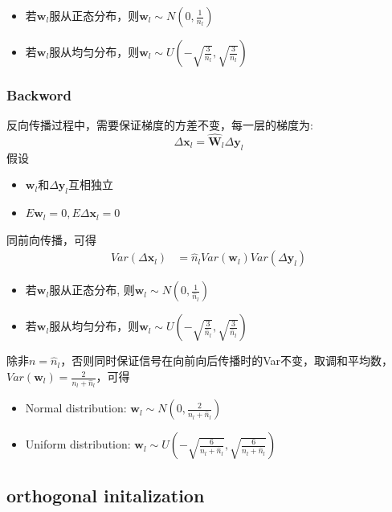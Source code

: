 \begin{itemize}
    \item 若$\mathbf{w}_l$服从正态分布，则$\mathbf{w}_l \sim N(0, \frac{1}{n_l})$
    \item 若$\mathbf{w}_l$服从均匀分布，则$\mathbf{w}_l \sim U(-\sqrt{\frac{3}{n_l}}, \sqrt{\frac{3}{n_l}})$
\end{itemize}

\subsubsection{Backword}
反向传播过程中，需要保证梯度的方差不变，每一层的梯度为:
\begin{equation}
    \Delta \mathbf{x}_l = \hat{\mathbf{W}}_l \Delta \mathbf{y}_l
\end{equation}
假设
\begin{itemize}
    \item $\mathbf{w}_l$和$\Delta{\mathbf{y}}_l$互相独立
    \item $E\mathbf{w}_l = 0, E\Delta{\mathbf{x}}_l = 0$
\end{itemize}
同前向传播，可得
\begin{equation}
    \begin{split}
        Var(\Delta{\mathbf{x}_l}) &= \hat n_l Var(\mathbf{w}_l)Var(\Delta{\mathbf{y}}_l)
    \end{split}
\end{equation}
\begin{itemize}
    \item 若$\mathbf{w}_l$服从正态分布, 则$\mathbf{w}_l \sim N(0, \frac{1}{\hat n_l})$
    \item 若$\mathbf{w}_l$服从均匀分布，则$\mathbf{w}_l \sim U(-\sqrt{\frac{3}{\hat n_l}}, \sqrt{\frac{3}{\hat n_l}})$
\end{itemize}

除非$n = \hat n_l$，否则同时保证信号在向前向后传播时的Var不变，取调和平均数，$Var(\mathbf{w}_l) = \frac{2}{n_l + \hat n_l}$，可得
\begin{itemize}
    \item Normal distribution: $\mathbf{w}_l \sim N(0, \frac{2}{n_l + \hat n_l})$
    \item Uniform distribution: $\mathbf{w}_l \sim U(-\sqrt{\frac{6}{n_l+\hat n_l}}, \sqrt{\frac{6}{n_l+\hat n_l}})$
\end{itemize}


\subsection{orthogonal initalization}

